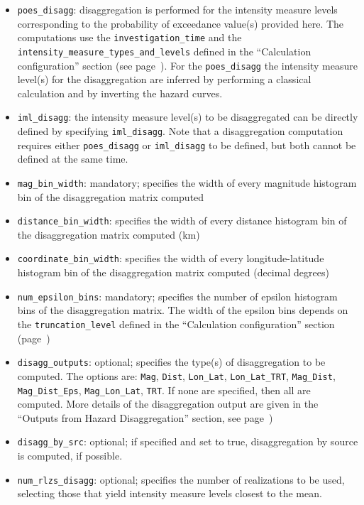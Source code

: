 \begin{itemize}

    \item \Verb+poes_disagg+: disaggregation is performed for the intensity
    measure levels corresponding to the probability of exceedance value(s) provided
    here. The computations use the \texttt{investigation\_time} and the
    \texttt{intensity\_measure\_types\_and\_levels} defined in the
    ``Calculation configuration'' section   (see page~\pageref{sec:calculation_configuration}).
    For the \texttt{poes\_disagg} the intensity measure level(s) for the disaggregation are
    inferred by performing a classical calculation and by inverting the hazard curves.

    \item \Verb+iml_disagg+: the intensity measure level(s) to be disaggregated
	    can be directly defined by specifying \texttt{iml\_disagg}. Note
		that a disaggregation computation requires either
		\texttt{poes\_disagg} or \texttt{iml\_disagg} to be defined, but
		both cannot be defined at the same time.

    \item \Verb+mag_bin_width+: mandatory; specifies the width of every
	    magnitude histogram bin of the disaggregation matrix computed

    \item \Verb+distance_bin_width+: specifies the width of every distance
	    histogram bin of the disaggregation matrix computed (km)

    \item \Verb+coordinate_bin_width+: specifies the width of every
	    longitude-latitude histogram bin of the disaggregation matrix
		computed (decimal degrees)

    \item \Verb+num_epsilon_bins+: mandatory; specifies the number of epsilon
	    histogram bins of the disaggregation matrix. The width of the
		epsilon bins depends on the \texttt{truncation\_level} defined
		in the ``Calculation configuration'' section
		(page~\pageref{sec:calculation_configuration})

    \item \Verb+disagg_outputs+: optional; specifies the type(s) of
	    disaggregation to be computed. The options are: \texttt{Mag},
		\texttt{Dist}, \texttt{Lon\_Lat}, \texttt{Lon\_Lat\_TRT},
		\texttt{Mag\_Dist}, \texttt{Mag\_Dist\_Eps},
		\texttt{Mag\_Lon\_Lat}, \texttt{TRT}. If none are specified,
		then all are computed. More details of the disaggregation output
		are given in the ``Outputs from Hazard Disaggregation'' section,
		see page~\pageref{subsec:output_hazard_disaggregation})

    \item \Verb+disagg_by_src+: optional; if specified and set to true,
	    disaggregation by source is computed, if possible.

    \item \Verb+num_rlzs_disagg+: optional; specifies the number of realizations
	    to be used, selecting those that yield intensity measure levels
		closest to the mean.  

\end{itemize}


